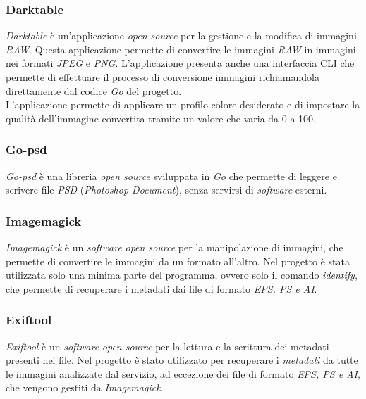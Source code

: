 \subsubsection*{Darktable}

\emph{Darktable} è un'applicazione \emph{open source} per la gestione e la
modifica di immagini \emph{RAW}. Questa applicazione permette di convertire le
immagini \emph{RAW} in immagini nei formati \emph{JPEG} e \emph{PNG}.
L'applicazione presenta anche una interfaccia \glsfirstoccur\gls{CLI} che
permette di effettuare il processo di conversione immagini richiamandola
direttamente dal codice \emph{Go} del progetto.\\
L'applicazione permette di applicare un profilo colore desiderato e di impostare
la qualità dell'immagine convertita tramite un valore che varia da 0 a 100. \cite{darktable}

\subsubsection*{Go-psd}

\emph{Go-psd} è una libreria \emph{open source} sviluppata in \emph{Go} che
permette di leggere e scrivere file \emph{PSD} (\emph{Photoshop Document}),
senza servirsi di \emph{software} esterni. \cite{go-psd}

\subsubsection*{Imagemagick}

\emph{Imagemagick} è un \emph{software} \emph{open source} per la manipolazione
di immagini, che permette di convertire le immagini da un formato all'altro.
Nel progetto è stata utilizzata solo una minima parte del programma, ovvero
solo il comando \emph{identify}, che permette di recuperare i metadati dai file
di formato \emph{EPS, PS e AI}. \cite{imagemagick}

\subsubsection*{Exiftool}

\emph{Exiftool} è un \emph{software} \emph{open source} per la lettura e la
scrittura dei metadati presenti nei file. Nel progetto è stato utilizzato per
recuperare i \emph{metadati} da tutte le immagini analizzate dal servizio, ad
eccezione dei file di formato \emph{EPS, PS e AI}, che vengono gestiti da
\emph{Imagemagick}.\cite{exiftool}

